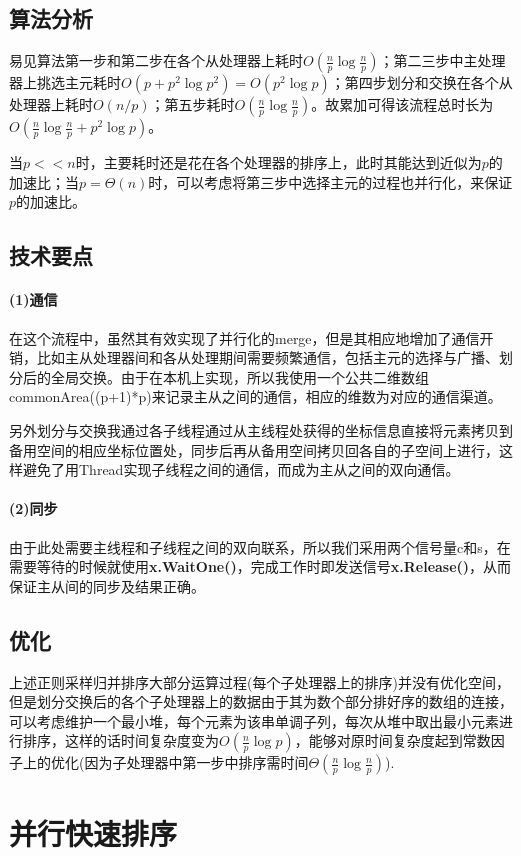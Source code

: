 \documentclass[UTF8]{article}
\begin{document}
\subsection{算法分析}
易见算法第一步和第二步在各个从处理器上耗时$O(\frac{n}{p}\log\frac{n}{p})$；第二三步中主处理器上挑选主元耗时$O(p+p^2\log p^2)=O(p^2\log p)$；第四步划分和交换在各个从处理器上耗时$O(n/p)$；第五步耗时$O(\frac{n}{p}\log\frac{n}{p})$。故累加可得该流程总时长为$O(\frac{n}{p}\log\frac{n}{p}+p^2\log p)$。
\par 当$p<<n$时，主要耗时还是花在各个处理器的排序上，此时其能达到近似为$p$的加速比；当$p=\Theta(n)$时，可以考虑将第三步中选择主元的过程也并行化，来保证$p$的加速比。
\subsection{技术要点}
\paragraph{(1)通信} 在这个流程中，虽然其有效实现了并行化的merge，但是其相应地增加了通信开销，比如主从处理器间和各从处理期间需要频繁通信，包括主元的选择与广播、划分后的全局交换。由于在本机上实现，所以我使用一个公共二维数组commonArea((p+1)*p)来记录主从之间的通信，相应的维数为对应的通信渠道。
\par 另外划分与交换我通过各子线程通过从主线程处获得的坐标信息直接将元素拷贝到备用空间的相应坐标位置处，同步后再从备用空间拷贝回各自的子空间上进行，这样避免了用Thread实现子线程之间的通信，而成为主从之间的双向通信。
\paragraph{(2)同步}由于此处需要主线程和子线程之间的双向联系，所以我们采用两个信号量c和s，在需要等待的时候就使用\textbf{x.WaitOne()}，完成工作时即发送信号\textbf{x.Release()}，从而保证主从间的同步及结果正确。
\subsection{优化}
上述正则采样归并排序大部分运算过程(每个子处理器上的排序)并没有优化空间，但是划分交换后的各个子处理器上的数据由于其为数个部分排好序的数组的连接，可以考虑维护一个最小堆，每个元素为该串单调子列，每次从堆中取出最小元素进行排序，这样的话时间复杂度变为$O(\frac{n}{p}\log p)$，能够对原时间复杂度起到常数因子上的优化(因为子处理器中第一步中排序需时间$\Theta(\frac{n}{p}\log\frac{n}{p})$).
\section{并行快速排序}
\end{document}
